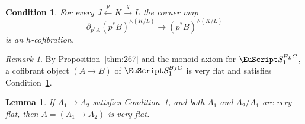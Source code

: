 \documentclass{amsart}
\newtheorem{lem}[equation]{Lemma}
\newtheorem{cond}[equation]{Condition}
\newtheorem{rem}[equation]{Remark}
\theoremstyle{definition}
\theoremstyle{remark}
\newtheorem{rem}[equation]{Remark}
\newcommand{\spectra}{\EuScript S}
\newcommand{\cat}[1]{{\mathcal #1}}
\newcommand{\aspectra}[1]{\spectra_{1}^{#1}}
\begin{document}
\begin{cond}
\label{cond:1}
For every $J\xleftarrow{p} K \xrightarrow{q} L$ the corner map 
\[
\partial_{p^{\ast}A}(p^{\ast}B)^{\wedge(K/L)} \to (p^{\ast}B)^{\wedge(K/L)}
\]
is an $h$-cofibration.  
\end{cond}


\begin{rem}
\label{rem:39} By Proposition~\ref{thm:267} and the monoid axiom for
$\aspectra{\cat B_{L}G}$, a cofibrant object $(A\to B)$ of
$\aspectra{\cat{B}_{J}G}$ is very flat and satisfies
Condition~\ref{cond:1}.
\end{rem}

\begin{lem}
\label{thm:244}
If $A_{1}\to A_{2}$ satisfies Condition~\ref{cond:1}, and both $A_{1}$ and $A_{2}/A_{1}$
are very flat, then  $A=(A_{1}\to A_{2})$ is very flat.
\end{lem}
\end{document}
